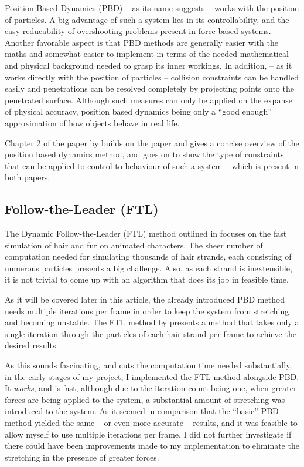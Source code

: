 \documentclass[sigplan,screen,nonacm]{acmart}
\begin{document}
Position Based Dynamics (PBD) -- as its name suggests -- works with the position
of particles. A big advantage of such a system lies in its controllability, and
the easy reducability of overshooting problems present in force based systems.
Another favorable aspect is that PBD methods are generally easier with the maths
and somewhat easier to implement in terms of the needed mathematical and
physical background needed to grasp its inner workings. In addition, -- as it
works directly with the position of particles -- collision constraints can be
handled easily and penetrations can be resolved completely by projecting points
onto the penetrated surface. Although such measures can only be applied on the
expanse of physical accuracy, position based dynamics being only a ``good
enough'' approximation of how objects behave in real life.

Chapter 2 of the paper by \citet{UmenhofferSimulation} builds on the
\citet{MullerPBD} paper and gives a concise overview of the position based
dynamics method, and goes on to show the type of constraints that can be applied
to control to behaviour of such a system -- which is present in both papers.


\subsection{Follow-the-Leader (FTL)}
The Dynamic Follow-the-Leader (FTL) method outlined in \citet{FTLHair} focuses
on the fast simulation of hair and fur on animated characters. The sheer number
of computation needed for simulating thousands of hair strands, each consisting
of numerous particles presents a big challenge. Also, as each strand is
inextensible, it is not trivial to come up with an algorithm that does its job
in feasible time. 

As it will be covered later in this article, the already introduced PBD method
needs multiple iterations per frame in order to keep the system from stretching
and becoming unstable. The FTL method by \citet{FTLHair} presents a method that
takes only a single iteration through the particles of each hair strand per
frame to achieve the desired results.

As this sounds fascinating, and cuts the computation time needed substantially,
in the early stages of my project, I implemented the FTL method alongside PBD.
It \textit{works}, and is fast, although due to the iteration count being one,
when greater forces are being applied to the system, a substantial amount of
stretching was introduced to the system. As it seemed in comparison that the
``basic'' PBD method yielded the same -- or even more accurate -- results, and
it was feasible to allow myself to use multiple iterations per frame, I did
not further investigate if there could have been improvements made to my
implementation to eliminate the stretching in the presence of greater forces.
\end{document}
